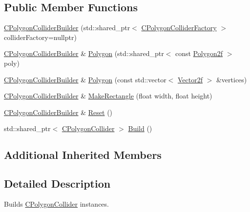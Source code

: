 \subsection*{Public Member Functions}
\begin{DoxyCompactItemize}
\item 
\hyperlink{classastu_1_1suite2d_1_1CPolygonColliderBuilder_aea66d3118aedf7748ccb3bd6115f2961}{C\+Polygon\+Collider\+Builder} (std\+::shared\+\_\+ptr$<$ \hyperlink{classastu_1_1suite2d_1_1CPolygonColliderFactory}{C\+Polygon\+Collider\+Factory} $>$ collider\+Factory=nullptr)
\item 
\hyperlink{classastu_1_1suite2d_1_1CPolygonColliderBuilder}{C\+Polygon\+Collider\+Builder} \& \hyperlink{classastu_1_1suite2d_1_1CPolygonColliderBuilder_a5b4a20190025ac8a54e4c6da2ef55cf7}{Polygon} (std\+::shared\+\_\+ptr$<$ const \hyperlink{group__math__group_ga39ca0cd425ff5edd2a090d6997ce8c2a}{Polygon2f} $>$ poly)
\item 
\hyperlink{classastu_1_1suite2d_1_1CPolygonColliderBuilder}{C\+Polygon\+Collider\+Builder} \& \hyperlink{classastu_1_1suite2d_1_1CPolygonColliderBuilder_a11e3b9cace57e712bfae12de926458bb}{Polygon} (const std\+::vector$<$ \hyperlink{classastu_1_1Vector2}{Vector2f} $>$ \&vertices)
\item 
\hyperlink{classastu_1_1suite2d_1_1CPolygonColliderBuilder}{C\+Polygon\+Collider\+Builder} \& \hyperlink{classastu_1_1suite2d_1_1CPolygonColliderBuilder_a05b7196e63bc3466a31fefc6df121a58}{Make\+Rectangle} (float width, float height)
\item 
\hyperlink{classastu_1_1suite2d_1_1CPolygonColliderBuilder}{C\+Polygon\+Collider\+Builder} \& \hyperlink{classastu_1_1suite2d_1_1CPolygonColliderBuilder_ac8d3cf69f1fc687ab4aef32aa12383df}{Reset} ()
\item 
std\+::shared\+\_\+ptr$<$ \hyperlink{classastu_1_1suite2d_1_1CPolygonCollider}{C\+Polygon\+Collider} $>$ \hyperlink{classastu_1_1suite2d_1_1CPolygonColliderBuilder_a0ddc14822d47cf0fe115ed47d7c3095e}{Build} ()
\end{DoxyCompactItemize}
\subsection*{Additional Inherited Members}


\subsection{Detailed Description}
Builds \hyperlink{classastu_1_1suite2d_1_1CPolygonCollider}{C\+Polygon\+Collider} instances. 

